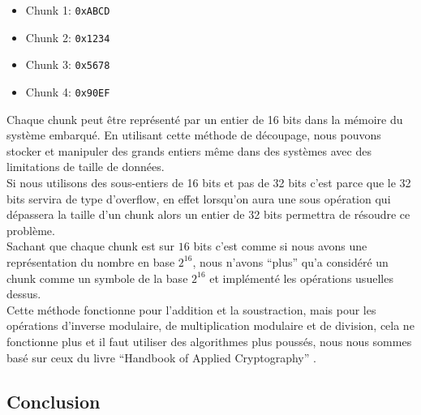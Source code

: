 \begin{itemize}
\item Chunk 1: \texttt{0xABCD}
\item Chunk 2: \texttt{0x1234}
\item Chunk 3: \texttt{0x5678}
\item Chunk 4: \texttt{0x90EF}
\end{itemize}

Chaque chunk peut être représenté par un entier de 16 bits dans la mémoire du système embarqué. En utilisant cette méthode de découpage, nous pouvons stocker et manipuler des grands entiers même dans des systèmes avec des limitations de taille de données.\\

Si nous utilisons des sous-entiers de 16 bits et pas de 32 bits c'est parce que le 32 bits servira de type d'overflow, en effet lorsqu'on aura une sous opération qui dépassera la taille d'un chunk alors un entier de 32 bits permettra de résoudre ce problème.\\

Sachant que chaque chunk est sur $16$ bits c'est comme si nous avons une représentation du nombre en base $2^{16}$, nous n'avons ``plus'' qu'a considéré un chunk comme un symbole de la base $2^{16}$ et implémenté les opérations usuelles dessus.\\

Cette méthode fonctionne pour l'addition et la soustraction, mais pour les opérations d'inverse modulaire, de multiplication modulaire et de division, cela ne fonctionne plus et il faut utiliser des algorithmes plus poussés, nous nous sommes basé sur ceux du livre ``Handbook of Applied Cryptography'' \cite{hac:ch14}.
\subsection{Conclusion}

